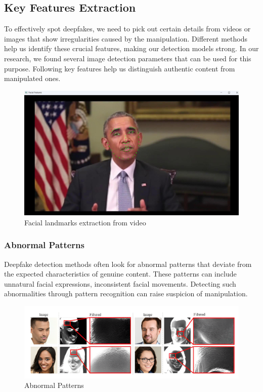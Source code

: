 \subsection{Key Features Extraction}

To effectively spot deepfakes, we need to pick out certain details from videos or images that show irregularities caused by the manipulation. Different methods help us identify these crucial features, making our detection models strong. In our research, we found several image detection parameters that can be used for this purpose. Following key features help us distinguish authentic content from manipulated ones.
\begin{figure}[htbp]
    \centering
    \includegraphics[width= 5in ]{img/featureshighlight.jpg}
    \caption{{Facial landmarks extraction from video}}
\end{figure}
\subsubsection{Abnormal Patterns}

Deepfake detection methods often look for abnormal patterns that deviate from the expected characteristics of genuine content. These patterns can include unnatural facial expressions, inconsistent facial movements. Detecting such abnormalities through pattern recognition can raise suspicion of manipulation.
\begin{figure}[htbp]
    \centering
    \includegraphics[width=5in]{img/abnormal_pattern.png}
    \caption{{Abnormal Patterns}}
\end{figure}


